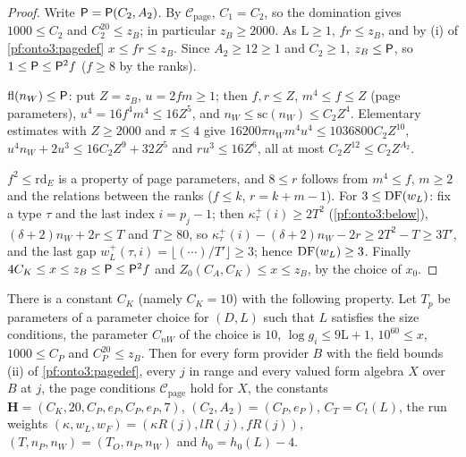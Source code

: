\begin{proof}
Write $\mathsf{P}=\mathsf{P}(C_2,A_2)$. By $\mathcal C_{\mathrm{page}}$, $C_1=C_2$, so the domination gives $1000\le C_2$
and $C_2^{20}\le z_B$; in particular $z_B\ge2000$. As $\mathrm L\ge1$, $fr\le z_B$, and by (i) of
\cref{pf:onto3:pagedef} $x\le fr\le z_B$. Since $A_2\ge12\ge1$ and $C_2\ge1$, $z_B\le\mathsf{P}$, so $1\le\mathsf{P}\le
\mathsf{P}^2f$ ($f\ge8$ by the ranks).

$\mathrm{fl}(n_W)\le\mathsf{P}$: put $Z=z_B$, $u=2fm\ge1$; then $f,r\le Z$, $m^4\le f\le Z$ (page parameters), $u^4=16f^4m^4
\le16Z^5$, and $n_W\le\mathrm{sc}(n_W)\le C_2Z^4$. Elementary estimates with $Z\ge2000$ and $\pi\le4$ give $16200\pi n_Wm^4u^4
\le1036800C_2Z^{10}$, $u^4n_W+2u^3\le16C_2Z^9+32Z^5$ and $ru^3\le16Z^6$, all at most $C_2Z^{12}\le C_2Z^{A_2}$.

$f^2\le\mathrm{rd}_E$ is a property of page parameters, and $8\le r$ follows from $m^4\le f$, $m\ge2$ and the relations
between the ranks ($f\le k$, $r=k+m-1$). For $3\le\operatorname{DF}(w_L)$: fix a type $\tau$ and the last index $i=p_j-1$; then
$\kappa^+_\tau(i)\ge2T^2$ (\cref{pf:onto3:below}), $(\delta+2)n_W+2r\le T$ and $T\ge80$, so
$\kappa^+_\tau(i)-(\delta+2)n_W-2r\ge2T^2-T\ge3T'$, and the last gap $w_L^+(\tau,i)=\lfloor(\cdots)/T'\rfloor\ge3$; hence
$\operatorname{DF}(w_L)\ge3$. Finally $4C_K\le x\le z_B\le\mathsf{P}\le\mathsf{P}^2f$ and $Z_0(C_A,C_K)\le x\le z_B$, by the
choice of $x_0$.
\end{proof}

\begin{proposition}\label{pf:onto3:pagerun}
There is a constant $C_K$ (namely $C_K=10$) with the following property. Let $T_p$ be parameters of a parameter choice for
$(D,L)$ such that $L$ satisfies the size conditions, the parameter $C_{nW}$ of the choice is $10$, $\log g_i\le9\mathrm L+1$,
$10^{60}\le x$, $1000\le C_P$ and $C_P^{20}\le z_B$. Then for every form provider $B$ with the field bounds (ii) of
\cref{pf:onto3:pagedef}, every $j$ in range and every valued form algebra $X$ over $B$ at $j$, the page conditions
$\mathcal C_{\mathrm{page}}$ hold for $X$, the constants $\mathbf H=(C_K,20,C_P,e_P,C_P,e_P,7)$, $(C_2,A_2)=(C_P,e_P)$,
$C_T=C_t(L)$, the run weights $(\kappa,w_L,w_F)=(\kappa R(j),lR(j),fR(j))$, $(T,n_P,n_W)=(T_O,n_P,n_W)$ and $h_0=h_0(L)-4$.
\end{proposition}

